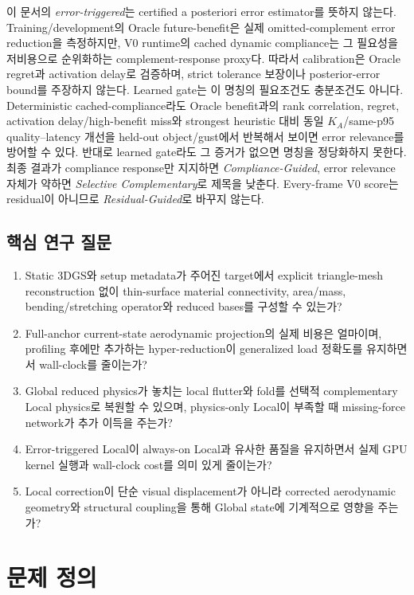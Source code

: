 \documentclass[11pt,a4paper]{article}
\begin{document}
이 문서의 \emph{error-triggered}는 certified a posteriori error estimator를 뜻하지 않는다.
Training/development의 Oracle future-benefit은 실제 omitted-complement error reduction을 측정하지만,
V0 runtime의 cached dynamic compliance는 그 필요성을 저비용으로 순위화하는
complement-response proxy다. 따라서 calibration은 Oracle regret과 activation delay로 검증하며,
strict tolerance 보장이나 posterior-error bound를 주장하지 않는다.
Learned gate는 이 명칭의 필요조건도 충분조건도 아니다.
Deterministic cached-compliance라도 Oracle benefit과의 rank correlation, regret,
activation delay/high-benefit miss와 strongest heuristic 대비 동일 \(K_A\)/same-p95 quality--latency 개선을
held-out object/gust에서 반복해서 보이면
error relevance를 방어할 수 있다. 반대로 learned gate라도 그 증거가 없으면 명칭을 정당화하지 못한다.
최종 결과가 compliance response만 지지하면 \emph{Compliance-Guided},
error relevance 자체가 약하면 \emph{Selective Complementary}로 제목을 낮춘다.
Every-frame V0 score는 residual이 아니므로 \emph{Residual-Guided}로 바꾸지 않는다.

\subsection{핵심 연구 질문}

\begin{enumerate}[leftmargin=1.7em]
  \item Static 3DGS와 setup metadata가 주어진 target에서 explicit triangle-mesh reconstruction 없이
  thin-surface material connectivity, area/mass, bending/stretching operator와 reduced bases를 구성할 수 있는가?
  \item Full-anchor current-state aerodynamic projection의 실제 비용은 얼마이며,
  profiling 후에만 추가하는 hyper-reduction이 generalized load 정확도를 유지하면서 wall-clock를 줄이는가?
  \item Global reduced physics가 놓치는 local flutter와 fold를
  선택적 complementary Local physics로 복원할 수 있으며,
  physics-only Local이 부족할 때 missing-force network가 추가 이득을 주는가?
  \item Error-triggered Local이 always-on Local과 유사한 품질을 유지하면서
  실제 GPU kernel 실행과 wall-clock cost를 의미 있게 줄이는가?
  \item Local correction이 단순 visual displacement가 아니라
  corrected aerodynamic geometry와 structural coupling을 통해 Global state에 기계적으로 영향을 주는가?
\end{enumerate}

\section{문제 정의}
\end{document}
